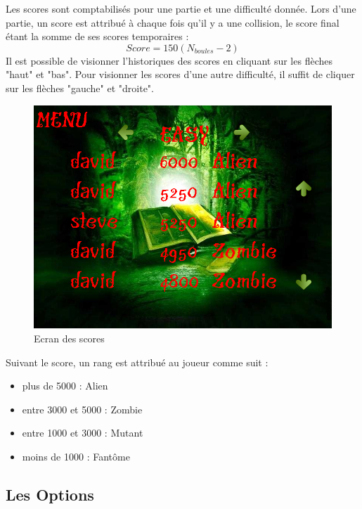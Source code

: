 Les scores sont comptabilisés pour une partie et une difficulté donnée. Lors d'une partie, un score est attribué à chaque fois qu'il y a une collision, le score final étant la somme de ses scores temporaires :
$$Score=150(N_{boules}-2)$$ 
Il est possible de visionner l'historiques des scores en cliquant sur les flèches "haut" et "bas". Pour visionner les scores d'une autre difficulté, il suffit de cliquer sur les flèches "gauche" et "droite".
\begin{figure}[H]
\begin{center}
\includegraphics[scale=0.3]{img/scor.png}
\caption {Ecran des scores}
\end{center}
\end{figure}
 Suivant le score, un rang est attribué au joueur comme suit :
\begin{itemize}
  \item plus de 5000 : Alien 
  \item entre 3000 et 5000 : Zombie 
  \item entre 1000 et 3000 : Mutant
  \item moins de 1000 : Fantôme
\end{itemize} 

\subsection{Les Options}

